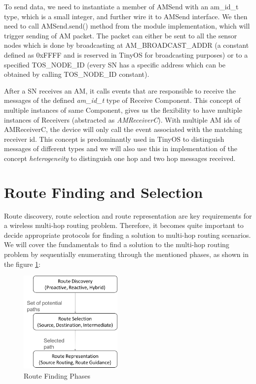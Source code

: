    To send data, we need to instantiate a member of AMSend with an am\_id\_t type, which is a small integer, and further wire it to AMSend interface. We then need to call AMSend.send() method from the module implementation, which will trigger sending of \ac{AM} packet. The packet can either be sent to all the sensor nodes which is done by broadcasting at AM\_BROADCAST\_ADDR (a constant defined as 0xFFFF and is reserved in TinyOS for broadcasting purposes) or to a specified TOS\_NODE\_ID (every \ac{SN} has a specific address which can be obtained by calling TOS\_NODE\_ID constant).
    
    \par
    After a \ac{SN} receives an \ac{AM}, it calls events that are responsible to receive the messages of the defined \textit{am\_id\_t} type of Receive Component. This concept of multiple instances of same Component, gives us the flexibility to have multiple instances of Receivers (abstracted as \textit{AMReceiverC}). With multiple \ac{AM} ids of AMReceiverC, the device will only call the event associated with the matching receiver id. This concept is predominantly used in TinyOS to distinguish messages of different types and we will also use this in implementation of the concept \textit{heterogeneity} to distinguish one hop and two hop messages received. 
    

\section{Route Finding and Selection}    

Route discovery, route selection and route representation are key requirements for a wireless multi-hop routing problem. Therefore, it becomes quite important to decide appropriate protocols for finding a solution to multi-hop routing scenarios. We will cover the fundamentals to find a solution to the multi-hop routing problem by sequentially enumerating through the mentioned phases, as shown in the figure \ref{fig:RouteFinding}:

\begin{figure}[h]
    \centering
	\includegraphics[height =5cm, keepaspectraio]{gfx/RouteFinding.png}
	\caption{Route Finding Phases}
	\label{fig:RouteFinding}
\end{figure}

